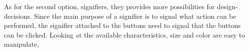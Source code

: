 {  As for the second option, signifiers, they provides more possibilities for
  design-decisions. Since the main purpose of a signifier is to signal what
  action can be performed, the signifier attached to the buttons need to signal
  that the buttons can be clicked. Looking at the available characteristics,
  size and color are easy to manipulate,












}
